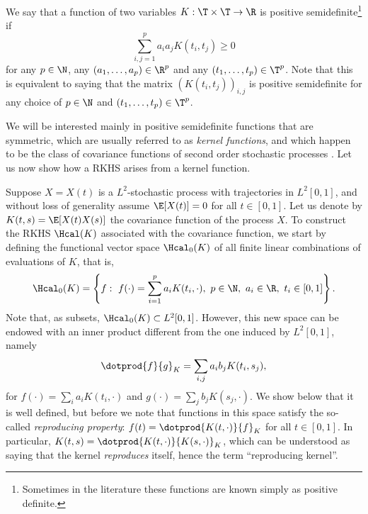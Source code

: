 \begin{definition}
  We say that a function of two variables \(K: \T \times \T \to \R\) is positive semidefinite\footnote{Sometimes in the literature these functions are known simply as positive definite.} if
  \[
    \sum_{i,j=1}^p a_ia_jK(t_i, t_j) \geq 0
  \]
  for any \(p\in\N\), any \((a_1,\dots, a_p)\in \R^p\) and any \((t_1,\dots, t_p)\in\T^p\). Note that this is equivalent to saying that the matrix \((K(t_i, t_j))_{i,j}\) is positive semidefinite for any choice of \(p\in\N\) and \((t_1,\dots, t_p)\in\T^p\).
\end{definition}

We will be interested mainly in positive semidefinite functions that are symmetric, which are usually referred to as \textit{kernel functions}, and which happen to be the class of covariance functions of second order stochastic processes \citep[][Th. 27]{berlinet2004reproducing}. Let us now show how a RKHS arises from a kernel function.

Suppose \(X=X(t)\) is a \(L^2\)-stochastic process with trajectories in \(L^2[0, 1]\), and without loss of generality assume \(\E[X(t)]=0\) for all \(t\in[0,1]\). Let us denote by \(K(t, s)= \E[X(t)X(s)]\) the covariance function of the process \(X\). To construct the RKHS \(\Hcal(K)\) associated with the covariance function, we start by defining the functional vector space \(\Hcal_0(K)\) of all finite linear combinations of evaluations of \(K\), that is,
\begin{equation}\label{eq:h0}
\Hcal_0(K) = \left\{ f: \ f(\cdot) = \sum_{i=1}^p a_i K(t_i, \cdot), \ p \in \N, \ a_i \in \R, \ t_i \in [0, 1] \right\}.
\end{equation}
Note that, as subsets, \(\Hcal_0(K)\subset L^2[0,1]\). However, this new space can be endowed with an inner product different from the one induced by \(L^2[0,1]\), namely
\[
\dotprod{f}{g}_K = \sum_{i, j} a_i b_j K(t_i, s_j),
\]
for \(f(\cdot)=\sum_i a_i K(t_i, \cdot) \) and \(g(\cdot)=\sum_j b_j K(s_j, \cdot)\). We show below that it is well defined, but before we note that functions in this space satisfy the so-called \textit{reproducing property}: \(f(t) = \dotprod{K(t, \cdot)}{f}_K\) for all \(t \in [0, 1]\). In particular, \(K(t, s)=\dotprod{K(t, \cdot)}{K(s, \cdot)}_K\), which can be understood as saying that the kernel \textit{reproduces} itself, hence the term ``reproducing kernel''.

